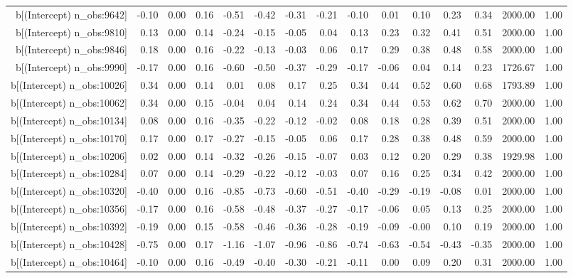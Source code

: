 \begin{table}[ht]
\begin{tabular}{rrrrrrrrrrrrrrr}
  b[(Intercept) n\_obs:9642] & -0.10 & 0.00 & 0.16 & -0.51 & -0.42 & -0.31 & -0.21 & -0.10 & 0.01 & 0.10 & 0.23 & 0.34 & 2000.00 & 1.00 \\ 
  b[(Intercept) n\_obs:9810] & 0.13 & 0.00 & 0.14 & -0.24 & -0.15 & -0.05 & 0.04 & 0.13 & 0.23 & 0.32 & 0.41 & 0.51 & 2000.00 & 1.00 \\ 
  b[(Intercept) n\_obs:9846] & 0.18 & 0.00 & 0.16 & -0.22 & -0.13 & -0.03 & 0.06 & 0.17 & 0.29 & 0.38 & 0.48 & 0.58 & 2000.00 & 1.00 \\ 
  b[(Intercept) n\_obs:9990] & -0.17 & 0.00 & 0.16 & -0.60 & -0.50 & -0.37 & -0.29 & -0.17 & -0.06 & 0.04 & 0.14 & 0.23 & 1726.67 & 1.00 \\ 
  b[(Intercept) n\_obs:10026] & 0.34 & 0.00 & 0.14 & 0.01 & 0.08 & 0.17 & 0.25 & 0.34 & 0.44 & 0.52 & 0.60 & 0.68 & 1793.89 & 1.00 \\ 
  b[(Intercept) n\_obs:10062] & 0.34 & 0.00 & 0.15 & -0.04 & 0.04 & 0.14 & 0.24 & 0.34 & 0.44 & 0.53 & 0.62 & 0.70 & 2000.00 & 1.00 \\ 
  b[(Intercept) n\_obs:10134] & 0.08 & 0.00 & 0.16 & -0.35 & -0.22 & -0.12 & -0.02 & 0.08 & 0.18 & 0.28 & 0.39 & 0.51 & 2000.00 & 1.00 \\ 
  b[(Intercept) n\_obs:10170] & 0.17 & 0.00 & 0.17 & -0.27 & -0.15 & -0.05 & 0.06 & 0.17 & 0.28 & 0.38 & 0.48 & 0.59 & 2000.00 & 1.00 \\ 
  b[(Intercept) n\_obs:10206] & 0.02 & 0.00 & 0.14 & -0.32 & -0.26 & -0.15 & -0.07 & 0.03 & 0.12 & 0.20 & 0.29 & 0.38 & 1929.98 & 1.00 \\ 
  b[(Intercept) n\_obs:10284] & 0.07 & 0.00 & 0.14 & -0.29 & -0.22 & -0.12 & -0.03 & 0.07 & 0.16 & 0.25 & 0.34 & 0.42 & 2000.00 & 1.00 \\ 
  b[(Intercept) n\_obs:10320] & -0.40 & 0.00 & 0.16 & -0.85 & -0.73 & -0.60 & -0.51 & -0.40 & -0.29 & -0.19 & -0.08 & 0.01 & 2000.00 & 1.00 \\ 
  b[(Intercept) n\_obs:10356] & -0.17 & 0.00 & 0.16 & -0.58 & -0.48 & -0.37 & -0.27 & -0.17 & -0.06 & 0.05 & 0.13 & 0.25 & 2000.00 & 1.00 \\ 
  b[(Intercept) n\_obs:10392] & -0.19 & 0.00 & 0.15 & -0.58 & -0.46 & -0.36 & -0.28 & -0.19 & -0.09 & -0.00 & 0.10 & 0.19 & 2000.00 & 1.00 \\ 
  b[(Intercept) n\_obs:10428] & -0.75 & 0.00 & 0.17 & -1.16 & -1.07 & -0.96 & -0.86 & -0.74 & -0.63 & -0.54 & -0.43 & -0.35 & 2000.00 & 1.00 \\ 
  b[(Intercept) n\_obs:10464] & -0.10 & 0.00 & 0.16 & -0.49 & -0.40 & -0.30 & -0.21 & -0.11 & 0.00 & 0.09 & 0.20 & 0.31 & 2000.00 & 1.00 \\ 

\end{tabular}
\end{table}
